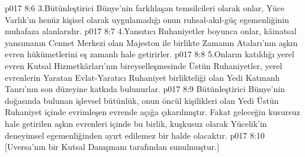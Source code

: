 \vs p017 8:6 3.\bibnobreakspace Bütünleştirici Bünye’nin farklılaşan temsilcileri olarak onlar, Yüce Varlık’ın henüz kişisel olarak uygulamadığı onun ruhsal\hyp{}akıl\hyp{}güç egemenliğinin muhafaza alanlarıdır.
\vs p017 8:7 4.\bibnobreakspace Yansıtıcı Ruhaniyetler boyunca onlar, kâinatsal yansımanın Cennet Merkezi olan Majeston ile birlikte Zamanın Ataları’nın aşkın evren hükümetlerini eş zamanlı hale getirirler.
\vs p017 8:8 5.\bibnobreakspace Onların katıldığı yerel evren Kutsal Hizmetkârları’nın bireyselleşmesinde Üstün Ruhaniyetler, yerel evrenlerin Yaratan Evlat\hyp{}Yaratıcı Ruhaniyet birlikteliği olan Yedi Katmanlı Tanrı’nın son düzeyine katkıda bulunurlar.
\vs p017 8:9 Bütünleştirici Bünye’nin doğasında bulunan işlevsel bütünlük, onun öncül kişilikleri olan Yedi Üstün Ruhaniyet içinde evrimleşen evrende açığa çıkarılmıştır. Fakat geleceğin kusursuz hale getirilen aşkın evrenleri içinde bu birlik, kuşkusuz olarak Yücelik’in deneyimsel egemenliğinden ayırt edilemez bir halde olacaktır.
\vs p017 8:10 [Uversa’nın bir Kutsal Danışmanı tarafından sunulmuştur.]

